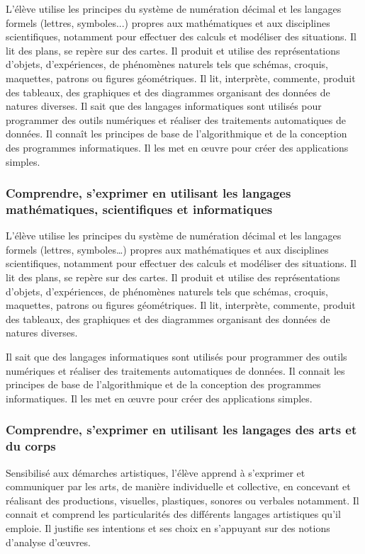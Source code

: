 L'élève utilise les principes du système de numération décimal et les langages formels (lettres, symboles...) propres aux mathématiques et aux disciplines scientifiques, notamment pour effectuer des calculs et modéliser des situations. Il lit des plans, se repère sur des cartes. Il produit et utilise des représentations d'objets, d'expériences, de phénomènes naturels tels que schémas, croquis, maquettes, patrons ou figures géométriques. Il lit, interprète, commente, produit des tableaux, des graphiques et des diagrammes organisant des données de natures diverses.
Il sait que des langages informatiques sont utilisés pour programmer des outils numériques et réaliser des traitements automatiques de données. Il connaît les principes de base de l'algorithmique et de la conception des programmes informatiques. Il les met en œuvre pour créer des applications simples.

\subsubsection{Comprendre, s’exprimer en utilisant les langages mathématiques, scientifiques et informatiques}
L’élève utilise les principes du système de numération décimal et les langages formels (lettres, symboles\dots) propres aux mathématiques et aux disciplines scientifiques, notamment pour effectuer des calculs et modéliser des situations. Il lit des plans, se repère sur des cartes. Il produit et utilise des représentations d’objets, d’expériences, de phénomènes naturels tels que schémas, croquis, maquettes, patrons ou figures géométriques. Il lit, interprète, commente, produit des tableaux, des graphiques et des diagrammes organisant des données de natures diverses.

Il sait que des langages informatiques sont utilisés pour programmer des outils numériques et réaliser des traitements automatiques de données. Il connait les principes de base de l’algorithmique et de la conception des programmes informatiques. Il les met en œuvre pour créer des applications simples.

\subsubsection{Comprendre, s’exprimer en utilisant les langages des arts et du corps}
Sensibilisé aux démarches artistiques, l’élève apprend à s’exprimer et communiquer par les arts, de manière individuelle et collective, en concevant et réalisant des productions, visuelles, plastiques, sonores ou verbales notamment. Il connait et comprend les particularités des différents langages artistiques qu’il emploie. Il justifie ses intentions et ses choix en s’appuyant sur des notions d’analyse d’œuvres.

